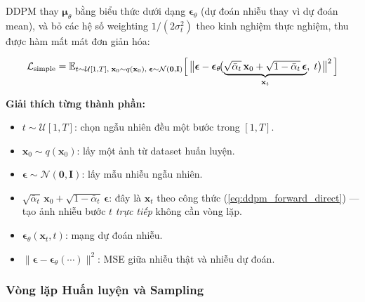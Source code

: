 DDPM thay $\boldsymbol{\mu}_\theta$ bằng biểu thức dưới dạng $\boldsymbol{\epsilon}_\theta$ (dự đoán nhiễu thay vì dự đoán mean), và bỏ các hệ số weighting $1/(2\sigma_t^2)$ theo kinh nghiệm thực nghiệm, thu được hàm mất mát đơn giản hóa:

\begin{equation}
    \mathcal{L}_{\text{simple}} = \mathbb{E}_{t \sim \mathcal{U}[1,T],\;\mathbf{x}_0 \sim q(\mathbf{x}_0),\;\boldsymbol{\epsilon} \sim \mathcal{N}(\mathbf{0},\mathbf{I})}
    \Bigl[\,\bigl\|\boldsymbol{\epsilon} - \boldsymbol{\epsilon}_\theta\!\bigl(\underbrace{\sqrt{\bar{\alpha}_t}\,\mathbf{x}_0 + \sqrt{1-\bar{\alpha}_t}\,\boldsymbol{\epsilon}}_{\mathbf{x}_t},\; t\bigr)\bigr\|^2\,\Bigr]
    \label{eq:ddpm_loss}
\end{equation}

\textbf{Giải thích từng thành phần:}
\begin{itemize}
    \item $t \sim \mathcal{U}[1,T]$: chọn ngẫu nhiên đều một bước trong $[1,T]$.
    \item $\mathbf{x}_0 \sim q(\mathbf{x}_0)$: lấy một ảnh từ dataset huấn luyện.
    \item $\boldsymbol{\epsilon} \sim \mathcal{N}(\mathbf{0},\mathbf{I})$: lấy mẫu nhiễu ngẫu nhiên.
    \item $\sqrt{\bar{\alpha}_t}\,\mathbf{x}_0 + \sqrt{1-\bar{\alpha}_t}\,\boldsymbol{\epsilon}$: đây là $\mathbf{x}_t$ theo công thức (\ref{eq:ddpm_forward_direct}) --- tạo ảnh nhiễu bước $t$ \textit{trực tiếp} không cần vòng lặp.
    \item $\boldsymbol{\epsilon}_\theta(\mathbf{x}_t, t)$: mạng dự đoán nhiễu.
    \item $\|\boldsymbol{\epsilon} - \boldsymbol{\epsilon}_\theta(\cdots)\|^2$: MSE giữa nhiễu thật và nhiễu dự đoán.
\end{itemize}

\subsubsection{Vòng lặp Huấn luyện và Sampling}
\label{subsubsec:ddpm_train_sample}

